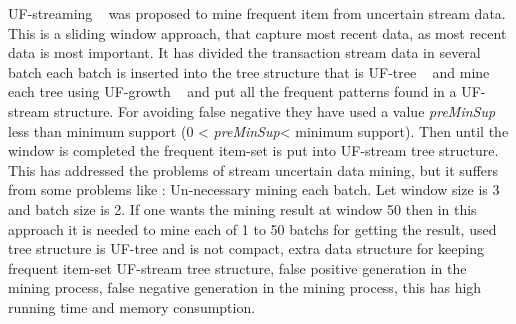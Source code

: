 \documentclass[conference]{IEEEtran}
\begin{document}
UF-streaming ~\cite{suf_growth} was proposed to mine frequent item from uncertain stream data. This is a sliding window approach, that capture most recent data, as most recent data is most important. It has divided the transaction stream data in several batch each batch is inserted into the tree structure that is UF-tree ~\cite{uf_growth} and mine each tree using UF-growth ~\cite{uf_growth} and put all the frequent patterns found in a UF-stream structure. For avoiding false negative they have used a value \emph{preMinSup} less than minimum support (0 < \emph{preMinSup}< minimum support). Then until the window is completed the frequent item-set is put into UF-stream tree structure. This has addressed the problems of stream uncertain data mining, but it suffers from some problems like : Un-necessary mining each batch. Let window size is 3 and batch size is 2. If one wants the mining result at window 50 then in this approach it is needed to mine each of 1 to 50 batchs for getting the result, used tree structure is UF-tree and is not compact, extra data structure for keeping frequent item-set UF-stream tree structure, false positive generation in the mining process, false negative generation in the mining process, this has high running time and memory consumption.
\end{document}
